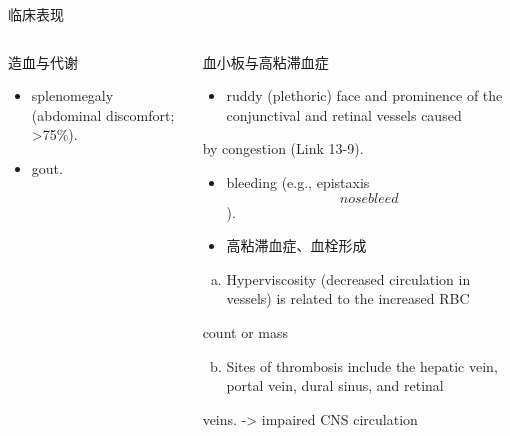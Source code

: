 \documentclass[
  ignorenonframetext,
]{beamer}
\providecommand{\tightlist}{%
  \setlength{\itemsep}{0pt}\setlength{\parskip}{0pt}}
\begin{document}
\begin{frame}
\begin{block}{临床表现}
\protect\hypertarget{ux4e34ux5e8aux8868ux73b0}{}
\end{block}

\begin{columns}[T]
\begin{column}{0.3\textwidth}
\begin{block}{造血与代谢}
\protect\hypertarget{ux9020ux8840ux4e0eux4ee3ux8c22}{}
\begin{itemize}
\item
  splenomegaly (abdominal discomfort; \textgreater75\%).
\item
  gout.
\end{itemize}
\end{block}
\end{column}

\begin{column}{0.3\textwidth}
\begin{block}{血小板与高粘滞血症}
\protect\hypertarget{ux8840ux5c0fux677fux4e0eux9ad8ux7c98ux6edeux8840ux75c7}{}
\begin{itemize}
\tightlist
\item
  ruddy (plethoric) face and prominence of the conjunctival and retinal
  vessels caused
\end{itemize}

by congestion (Link 13-9).

\begin{itemize}
\item
  bleeding (e.g., epistaxis \[nose bleed\]).
\item
  高粘滞血症、血栓形成
\end{itemize}

\begin{enumerate}
[(a)]
\tightlist
\item
  Hyperviscosity (decreased circulation in vessels) is related to the
  increased RBC
\end{enumerate}

count or mass

\begin{enumerate}
[(a)]
\setcounter{enumi}{1}
\tightlist
\item
  Sites of thrombosis include the hepatic vein, portal vein, dural
  sinus, and retinal
\end{enumerate}

veins. -\textgreater{} impaired CNS circulation
\end{block}
\end{column}


\end{columns}
\end{frame}
\end{document}
